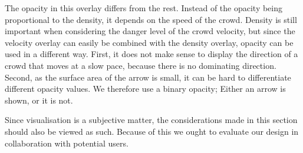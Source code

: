 The opacity in this overlay differs from the rest. Instead of the opacity being proportional to the density, it depends on the speed of the crowd. Density is still important when considering the danger level of the crowd velocity, but since the velocity overlay can easily be combined with the density overlay, opacity can be used in a different way. First, it does not make sense to display the direction of a crowd that moves at a slow pace, because there is no dominating direction. Second, as the surface area of the arrow is small, it can be hard to differentiate different opacity values. We therefore use a binary opacity; Either an arrow is shown, or it is not. 

Since visualisation is a subjective matter, the considerations made in this section should also be viewed as such. Because of this we ought to evaluate our design in collaboration with potential users.